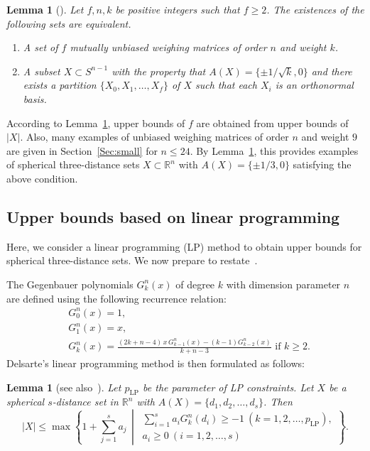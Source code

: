 \documentclass[12pt]{article}
\newtheorem{lem}[thm]{Lemma}
\theoremstyle{remark}
\newcommand{\RR}{\mathbb{R}}
\begin{document}
\begin{lem}[{\cite[Proposition~2.3]{NS}}]\label{lem:MUWM}
Let $f, n, k$ be positive integers such that $f\geq2$. 
The existences of the following sets are equivalent.
\begin{enumerate}
\item A set of $f$ mutually unbiased weighing matrices of order $n$ and weight $k$.  
\item A subset $X\subset  S^{n-1}$ with the property that 
$A(X)=\{\pm 1/\sqrt{k} ,0\}$
and there exists a partition $\{X_0,X_1,\ldots,X_f\}$ of $X$ such that each $X_i$ is an orthonormal basis.
\end{enumerate}
\end{lem}

According to Lemma~\ref{lem:MUWM}, upper bounds of $f$ are obtained from upper bounds of $|X|$.
Also, many examples of 
unbiased weighing matrices of order \( n \) and  weight $9$ are given in Section~\ref{Sec:small}
for \( n \le 24 \).
By Lemma~\ref{lem:MUWM},
this provides examples of  spherical three-distance sets $X \subset \RR^n$ 
with $A(X)=\{\pm 1/3 ,0\}$ satisfying the above condition.


\subsection{Upper  bounds based on linear programming}

Here, we consider a linear programming (LP) method to 
obtain upper bounds for spherical three-distance sets.
We now prepare to restate~\cite[Corollary 10]{BKR}.

The Gegenbauer polynomials $G_k^{n}(x)$ of degree $k$ with dimension parameter $n$
are defined using the following recurrence relation:
\begin{align*}
&G^{n}_{0}(x)=1, \\
&G^{n}_{1}(x)=x,\\
&G^{n}_{k}(x)={\frac{(2k+n-4) \, x \, G^{n}_{k-1}(x)-(k-1)G^{n}_{k-2}(x)}{k+n-3}} 
\text{ if }k\geq{2}.
\end{align*}
Delsarte's linear programming method is then formulated as follows:
\begin{lem}[{see also~\cite[Theorem~4.3]{DGS}}]\label{lem:LP}
Let $p_{\text{LP}}$ be the parameter of LP constraints. 
Let $X$ be a spherical $s$-distance set in $\RR^n$ with $A(X)=\{d_1,d_2,\ldots,d_s\}$. 
Then 
\[
|X|\leq \max
\left\{
1+\sum_{j=1}^s a_j
\, \middle|\,
\begin{array}{ll}
\sum_{i=1}^s a_i G^{n}_{k}(d_i)\geq -1\ ( k=1,2,\ldots, p_{\text{LP}}),\\
a_i\geq0 \ (i=1,2,\ldots,s)
\end{array}
\right\}.
\]
\end{lem}
\end{document}
